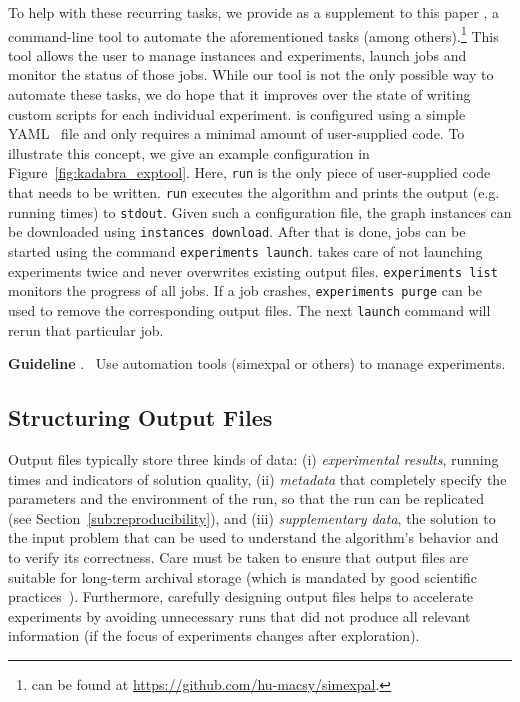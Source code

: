 \documentclass[algorithms,article,submit,moreauthors,pdftex]{Definitions/mdpi}
\newcounter{guideline}
\newcommand{\changed}[1]{#1}
\newcommand{\guideline}[1]{\par\smallskip\textbf{Guideline \theguideline\stepcounter{guideline}}.
\ #1\par\smallskip}
\begin{document}
	To help with these recurring tasks, we provide as a supplement to this paper \exptool,
	a command-line tool to automate the
	aforementioned tasks
	(among others).\footnote{\exptool can be found at \url{https://github.com/hu-macsy/simexpal}.}
	This tool allows the user to manage
	instances and experiments, launch jobs and monitor the status of those jobs.
	While our tool is not the only possible way to automate these tasks,
	we do hope that it improves over the state of writing custom scripts for
	each individual experiment.
	\exptool is configured using a simple YAML~\cite{yaml} file and only requires a minimal
	amount of user-supplied code. To illustrate this concept,
	we give an example configuration in Figure~\ref{fig:kadabra_exptool}.
	Here, \texttt{run} is the only piece of user-supplied code that needs to be written.
	\texttt{run} executes the algorithm and prints the output
	(e.g. running times) to \texttt{stdout}.
	Given such a configuration file, the graph instances can be downloaded using
	\texttt{\expcmd instances download}.
	After that is done, jobs can be started using the command
	\texttt{\expcmd experiments launch}. \exptool takes care of not
	launching experiments twice and never overwrites existing output files.
	\texttt{\expcmd experiments list}
	monitors the progress of all jobs. If a job crashes,
	\texttt{\expcmd experiments purge} can be used to remove
	the corresponding output files. The next \texttt{launch} command
	will rerun that particular job.

	\changed{\guideline{Use automation tools (\eg simexpal or others)
		to manage experiments.}}

\subsection{Structuring Output Files}
\label{sub:benchmark-output}
%
	Output files typically store three kinds of data:
	(i) \emph{experimental results}, \eg running times
	and \changed{indicators} of solution quality,
	(ii) \emph{metadata} that completely specify the parameters and
	the environment of the run, so that the run can be replicated
	(see Section~\ref{sub:reproducibility}),
	and (iii) \emph{supplementary data}, \eg the solution to the input problem
	that can be used to understand the algorithm's behavior and to verify
	its correctness.
	Care must be taken to ensure that output files are suitable
	for long-term archival storage (which is mandated by good
	scientific practices~\cite{dfg:data_guidelines}).
	Furthermore, carefully designing output files helps to
	accelerate experiments by avoiding unnecessary runs that did
	not produce all relevant information (\eg if the focus of experiments
	changes after exploration).
\end{document}
